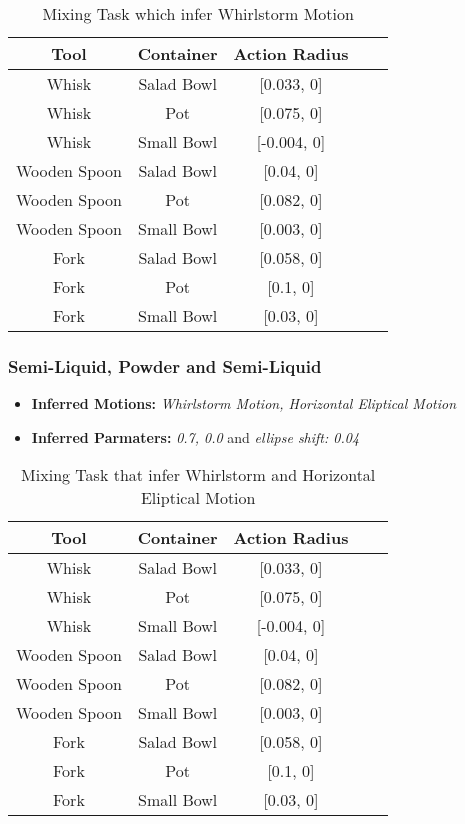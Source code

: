 \begin{table}[H]
    \centering
    \begin{tabular}{|c|c|c|c|c|}
      \hline
      \textbf{Tool} & \textbf{Container} & \textbf{Action Radius}\\
      \hline
      Whisk & Salad Bowl & [0.033, 0] \\
      \hline
      Whisk & Pot & [0.075, 0] \\
      \hline
      Whisk & Small Bowl & [-0.004, 0]\\
      \hline
      Wooden Spoon & Salad Bowl & [0.04, 0] \\
      \hline
      Wooden Spoon & Pot & [0.082, 0] \\
      \hline
      Wooden Spoon & Small Bowl & [0.003, 0] \\
      \hline
      Fork & Salad Bowl & [0.058, 0] \\
      \hline
      Fork & Pot & [0.1, 0] \\
      \hline
      Fork & Small Bowl & [0.03, 0] \\
      \hline
    \end{tabular}
    \caption{Mixing Task which infer Whirlstorm Motion}
    
  \end{table}



\subsubsection{Semi-Liquid, Powder and Semi-Liquid}
\begin{itemize}
    \item \textbf{Inferred Motions:} \textit{Whirlstorm Motion, Horizontal Eliptical Motion}
    \item \textbf{Inferred Parmaters:} \textit{0.7, 0.0} and \textit{ellipse shift: 0.04}
\end{itemize}
  
\begin{table}[H]
    \centering
    \begin{tabular}{|c|c|c|c|c|}
    \hline
    \textbf{Tool} & \textbf{Container} & \textbf{Action Radius}\\
    \hline
    Whisk & Salad Bowl & [0.033, 0] \\
    \hline
    Whisk & Pot & [0.075, 0] \\
    \hline
    Whisk & Small Bowl & [-0.004, 0]\\
    \hline
    Wooden Spoon & Salad Bowl & [0.04, 0] \\
    \hline
    Wooden Spoon & Pot & [0.082, 0] \\
    \hline
    Wooden Spoon & Small Bowl & [0.003, 0] \\
    \hline
    Fork & Salad Bowl & [0.058, 0] \\
    \hline
    Fork & Pot & [0.1, 0] \\
    \hline
    Fork & Small Bowl & [0.03, 0] \\
    \hline
\end{tabular}
\caption{Mixing Task that infer Whirlstorm and Horizontal Eliptical Motion}

\end{table}

